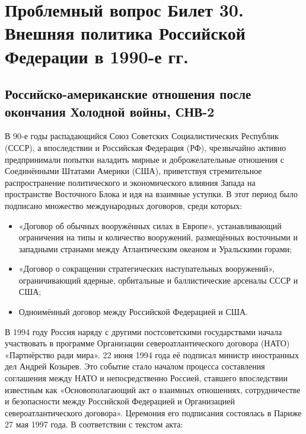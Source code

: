 \section{\textbf{Проблемный вопрос} Билет 30. Внешняя политика Российской Федерации в 1990-е гг.}
\subsection{Российско-американские отношения после окончания Холодной войны, СНВ-2}
В 90-е годы распадающийся Союз Советских Социалистических Республик (СССР), а впоследствии и Российская Федерация (РФ), чрезвычайно активно предпринимали попытки наладить мирные и доброжелательные отношения с Соединёнными Штатами Америки (США), приветствуя стремительное распространение политического и экономического влияния Запада на пространстве Восточного Блока и идя на взаимные уступки. В этот период было подписано множество международных договоров, среди которых:
\begin{itemize}
    \item «Договор об обычных вооружённых силах в Европе», устанавливающий ограничения на типы и количество вооружений, размещённых восточными и западными странами между Атлантическим океаном и Уральскими горами;
    \item «Договор о сокращении стратегических наступательных вооружений», ограничивающий ядерные, орбитальные и баллистические арсеналы СССР и США;
    \item Одноимённый договор между Российской Федерацией и США.
\end{itemize}
В 1994 году Россия наряду с другими постсоветскими государствами начала участвовать в программе Организации североатлантического договора (НАТО) «Партнёрство ради мира». 22 июня 1994 года её подписал министр иностранных дел Андрей Козырев. Это событие стало началом процесса составления соглашения между НАТО и непосредственно Россией, ставшего впоследствии известным как «Основополагающий акт о взаимных отношениях, сотрудничестве и безопасности между Российской Федерацией и Организацией североатлантического договора». Церемония его подписания состоялась в Париже 27 мая 1997 года.
  В соответствии с текстом акта:
